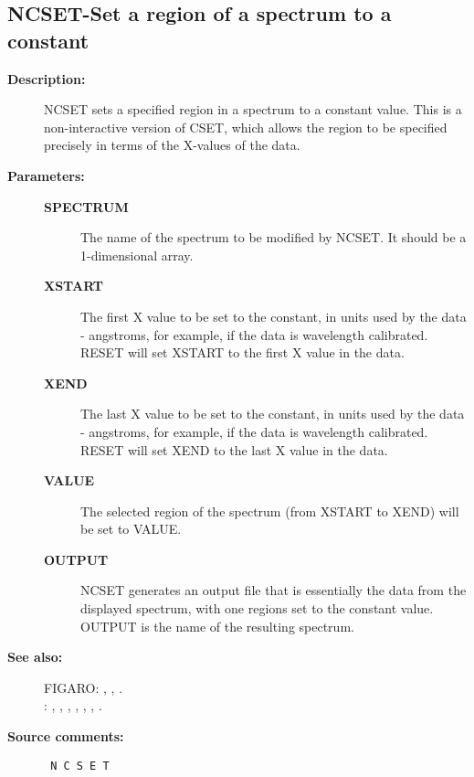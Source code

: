 \subsection{NCSET-\label{NCSET}Set a region of a spectrum to a constant}
\begin{description}

\item [{\bf Description:}]
 NCSET sets a specified region in a spectrum to a constant value.
 This is a non-interactive version of CSET, which allows the region
 to be specified precisely in terms of the X-values of the data.

\item [{\bf Parameters:}]
\begin{description}
\item [{\bf SPECTRUM}]
 The name of the spectrum to be modified by NCSET.
 It should be a 1-dimensional array.
\item [{\bf XSTART}]
 The first X value to be set to the constant,
 in units used by the data - angstroms, for example, if the
 data is wavelength calibrated.  RESET will set XSTART to the
 first X value in the data.
\item [{\bf XEND}]
 The last X value to be set to the constant,
 in units used by the data - angstroms, for example, if the
 data is wavelength calibrated.  RESET will set XEND to the
 last X value in the data.
\item [{\bf VALUE}]
 The selected region of the spectrum (from XSTART to
 XEND) will be set to VALUE.
\item [{\bf OUTPUT}]
 NCSET generates an output file that is essentially the
 data from the displayed spectrum, with one regions
 set to the constant value.  OUTPUT is the name of the
 resulting spectrum.
\end{description}

\item [{\bf See also:}]
FIGARO: , , .\\
: , , , , , , .\\

\item [{\bf Source comments:}]
\begin{verbatim}
 N C S E T


\end{verbatim}
\end{description}
